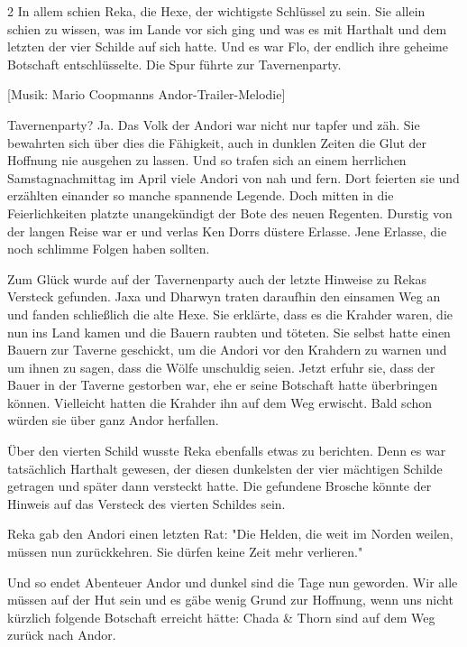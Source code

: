\documentclass[10pt, a4paper, oneside]{book}
\begin{document}
\begin{multicols}{2}
In allem schien Reka, die Hexe, der wichtigste Schlüssel zu sein. Sie allein schien zu wissen, was im Lande vor sich ging und was es mit Harthalt und dem letzten der vier Schilde auf sich hatte. Und es war Flo, der endlich ihre geheime Botschaft entschlüsselte. Die Spur führte zur Tavernenparty.
\bigskip

[Musik: Mario Coopmanns Andor-Trailer-Melodie]
\bigskip

Tavernenparty? Ja. Das Volk der Andori war nicht nur tapfer und zäh. Sie bewahrten sich über dies die Fähigkeit, auch in dunklen Zeiten die Glut der Hoffnung nie ausgehen zu lassen. Und so trafen sich an einem herrlichen Samstagnachmittag im April viele Andori von nah und fern. Dort feierten sie und erzählten einander so manche spannende Legende. Doch mitten in die Feierlichkeiten platzte unangekündigt der Bote des neuen Regenten. Durstig von der langen Reise war er und verlas Ken Dorrs düstere Erlasse. Jene Erlasse, die noch schlimme Folgen haben sollten.

Zum Glück wurde auf der Tavernenparty auch der letzte Hinweise zu Rekas Versteck gefunden. Jaxa und Dharwyn traten daraufhin den einsamen Weg an und fanden schließlich die alte Hexe. Sie erklärte, dass es die Krahder waren, die nun ins Land kamen und die Bauern raubten und töteten. Sie selbst hatte einen Bauern zur Taverne geschickt, um die Andori vor den Krahdern zu warnen und um ihnen zu sagen, dass die Wölfe unschuldig seien. Jetzt erfuhr sie, dass der Bauer in der Taverne gestorben war, ehe er seine Botschaft hatte überbringen können. Vielleicht hatten die Krahder ihn auf dem Weg erwischt. Bald schon würden sie über ganz Andor herfallen. 

Über den vierten Schild wusste Reka ebenfalls etwas zu berichten. Denn es war tatsächlich Harthalt gewesen, der diesen dunkelsten der vier mächtigen Schilde getragen und später dann versteckt hatte. Die gefundene Brosche könnte der Hinweis auf das Versteck des vierten Schildes sein. 

Reka gab den Andori einen letzten Rat: "Die Helden, die weit im Norden weilen, müssen nun zurückkehren. Sie dürfen keine Zeit mehr verlieren."

Und so endet Abenteuer Andor und dunkel sind die Tage nun geworden. Wir alle müssen auf der Hut sein und es gäbe wenig Grund zur Hoffnung, wenn uns nicht kürzlich folgende Botschaft erreicht hätte: Chada \& Thorn sind auf dem Weg zurück nach Andor.



\begin{chapterbox}



\end{chapterbox}
\end{multicols}
\end{document}
